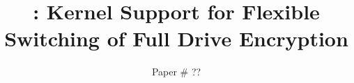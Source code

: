 















\def \mytitle {\sys: Navigating Tradeoffs in Stream Cipher Based Full Drive Encryption}

\def \mytitle {\sys: ?????????????}

\def \mytitle {\sys: Kernel Support for Flexible Switching of Full Drive Encryption}


\title{\vmintwenty\textsf{\textbf{\mytitle}}}
\author{Paper \# ??}

\maketitle


